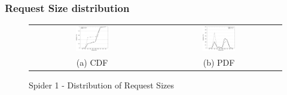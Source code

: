 \subsubsection{Request Size distribution}



\begin{figure}[!t]
\begin{center}
\begin{tabular}{cc}
\hspace*{-1cm}                                                           
{\includegraphics[width=0.27\textwidth]{./figs/spider1-reqSizeCDF.eps}}&
\hspace{-2mm}
{\includegraphics[width=0.27\textwidth]{./figs/spider1-reqSizePDF.eps}}\\
\small (a) CDF & \small(b) PDF \\
\end{tabular}
\vspace{-0.1in}
\captionsetup{justification=centering}
\caption{Spider 1 - Distribution of Request Sizes}
\label{fig:spider1-reqsizedist}
\end{center}
\end{figure}

